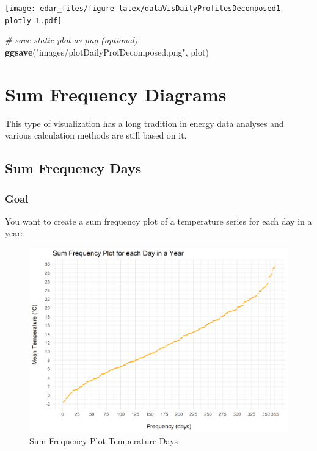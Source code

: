 \documentclass[
  a4paperpaper,
]{book}
\newenvironment{Shaded}{\begin{snugshade}}{\end{snugshade}}
\newcommand{\CommentTok}[1]{\textcolor[rgb]{0.56,0.35,0.01}{\textit{#1}}}
\newcommand{\KeywordTok}[1]{\textcolor[rgb]{0.13,0.29,0.53}{\textbf{#1}}}
\newcommand{\NormalTok}[1]{#1}
\newcommand{\StringTok}[1]{\textcolor[rgb]{0.31,0.60,0.02}{#1}}
\let\oldShaded\Shaded
\let\endoldShaded\endShaded
\renewenvironment{Shaded}{\footnotesize\oldShaded}{\endoldShaded}
\begin{document}
\texttt{[image: edar\_files/figure-latex/dataVisDailyProfilesDecomposed1 plotly-1.pdf]}

\begin{Shaded}
\begin{Highlighting}[]
\CommentTok{# save static plot as png (optional)}
\KeywordTok{ggsave}\NormalTok{(}\StringTok{"images/plotDailyProfDecomposed.png"}\NormalTok{, plot)}
\end{Highlighting}
\end{Shaded}

\hypertarget{sum-frequency-diagrams}{%
\chapter{Sum Frequency Diagrams}\label{sum-frequency-diagrams}}

This type of visualization has a long tradition in energy data analyses and various calculation methods are still based on it.

\newpage

\hypertarget{sum-frequency-days}{%
\section{Sum Frequency Days}\label{sum-frequency-days}}

\hypertarget{goal-16}{%
\subsection{Goal}\label{goal-16}}

You want to create a sum frequency plot of a temperature series for each day in a year:

\begin{figure}
\includegraphics[width=0.7\linewidth]{images/plotSumFrequencyDays} \caption{Sum Frequency Plot Temperature Days}\label{fig:unnamed-chunk-26}
\end{figure}
\end{document}

